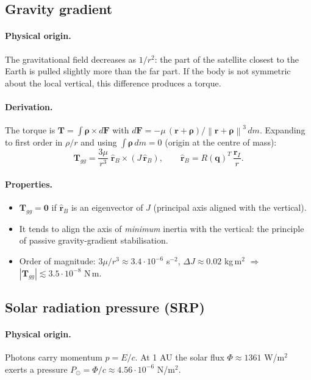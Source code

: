 \documentclass[11pt,a4paper]{article}
\newcommand{\vect}[1]{\bm{#1}}
\newcommand{\q}{\vect{q}}
\newcommand{\T}{\vect{T}}
\newcommand{\norm}[1]{\left\lVert #1 \right\rVert}
\begin{document}
\subsection{Gravity gradient}
\paragraph{Physical origin.} The gravitational field decreases as $1/r^2$: the
part of the satellite closest to the Earth is pulled slightly more than the
far part. If the body is not symmetric about the local vertical, this
difference produces a torque.

\paragraph{Derivation.} The torque is $\T = \int \vect\rho\times d\vect F$ with
$d\vect F = -\mu\,(\vect r+\vect\rho)/\norm{\vect r+\vect\rho}^3\,dm$.
Expanding to first order in $\rho/r$ and using
$\int\vect\rho\,dm = 0$ (origin at the centre of mass):
\begin{equation}
  \T_{gg} = \frac{3\mu}{r^3}\;\hat{\vect r}_B\times\left(J\,\hat{\vect r}_B\right),
  \qquad
  \hat{\vect r}_B = R(\q)^T\,\frac{\vect r_I}{r}.
\end{equation}

\paragraph{Properties.}
\begin{itemize}[nosep]
  \item $\T_{gg}=\vect 0$ if $\hat{\vect r}_B$ is an eigenvector of $J$ (principal
        axis aligned with the vertical).
  \item It tends to align the axis of \emph{minimum} inertia with the vertical:
        the principle of passive gravity-gradient stabilisation.
  \item Order of magnitude: $3\mu/r^3\approx 3.4\cdot10^{-6}$ s$^{-2}$,
        $\Delta J\approx 0.02$ kg\,m$^2$ $\Rightarrow$ $|\T_{gg}|\lesssim 3.5\cdot10^{-8}$ N\,m.
\end{itemize}

\subsection{Solar radiation pressure (SRP)}
\paragraph{Physical origin.} Photons carry momentum $p=E/c$.
At 1 AU the solar flux $\Phi\approx 1361$ W/m$^2$ exerts a pressure
$P_\odot = \Phi/c \approx 4.56\cdot10^{-6}$ N/m$^2$.
\end{document}
